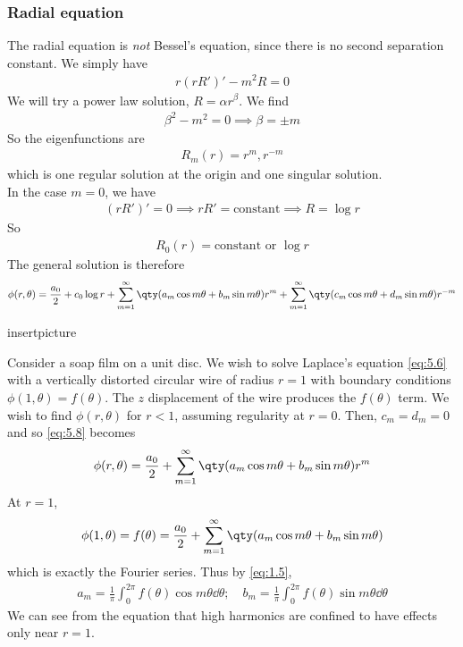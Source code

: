 \subsubsection{Radial equation}
The radial equation is \textit{not} Bessel's equation, since there is no second separation constant.
We simply have
\begin{align} \label{eq:5.7}
	r(rR')' - m^2 R = 0
\end{align}
We will try a power law solution, $R = \alpha r^\beta$.
We find
\begin{align*}
	\beta^2 - m^2 = 0 \implies \beta = \pm m
\end{align*}
So the eigenfunctions are
\begin{align*}
	R_m(r) = r^m, r^{-m}
\end{align*}
which is one regular solution at the origin and one singular solution. \\
In the case $m = 0$, we have
\begin{align*}
	(rR')' = 0 \implies rR' = \text{constant} \implies R = \log r
\end{align*}
So
\begin{align*}
	R_0(r) = \text{constant or } \log r
\end{align*}
The general solution is therefore
\begin{align} \label{eq:5.8}
	\phi(r,\theta) = \frac{a_0}{2} + c_0 \log r + \sum_{m=1}^\infty \qty(a_m \cos m\theta + b_m \sin m\theta) r^m + \sum_{m=1}^\infty \qty(c_m \cos m\theta + d_m \sin m\theta) r^{-m}
\end{align}

\begin{example}
    insertpicture

	Consider a soap film on a unit disc.
	We wish to solve Laplace's equation \cref{eq:5.6} with a vertically distorted circular wire of radius $r = 1$ with boundary conditions $\phi(1, \theta) = f(\theta)$.
	The $z$ displacement of the wire produces the $f(\theta)$ term.
	We wish to find $\phi(r,\theta)$ for $r < 1$, assuming regularity at $r = 0$.
	Then, $c_m = d_m = 0$ and so \cref{eq:5.8} becomes
	\begin{align*}
		\phi(r,\theta) = \frac{a_0}{2} + \sum_{m=1}^\infty \qty(a_m \cos m\theta + b_m \sin m\theta) r^m
	\end{align*}
	At $r = 1$,
	\begin{align*}
		\phi(1,\theta) = f(\theta) = \frac{a_0}{2} + \sum_{m=1}^\infty \qty(a_m \cos m\theta + b_m \sin m\theta)
	\end{align*}
	which is exactly the Fourier series.
	Thus by \cref{eq:1.5},
	\begin{align*}
		a_m = \frac{1}{\pi} \int_0^{2\pi} f(\theta) \cos m \theta \dd{\theta};\quad b_m = \frac{1}{\pi} \int_0^{2\pi} f(\theta) \sin m \theta \dd{\theta}
	\end{align*}
	We can see from the equation that high harmonics are confined to have effects only near $r = 1$.
\end{example}

